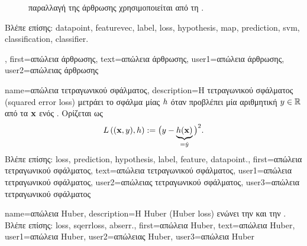 {{\begin{figure}[H]
\begin{center}
{{{			παραλλαγή της}  \foreignlanguage{greek}{άρθρωσης χρησιμοποιείται από τη}  
			\cite{LampertNowKernel}.}\label{fig_hingeloss_dict}}
		\end{center}
		\end{figure} 
	    	\foreignlanguage{greek}{Βλέπε επίσης:} \gls{datapoint}, \gls{featurevec}, \gls{label}, \gls{loss}, \gls{hypothesis}, \gls{map}, 
		\gls{prediction}, \gls{svm}, \gls{classification}, \gls{classifier}.},
	first={\foreignlanguage{greek}{απώλεια άρθρωσης}},
	text={\foreignlanguage{greek}{απώλεια άρθρωσης}},
	user1={\foreignlanguage{greek}{απώλεια άρθρωσης}}, %
	user2={\foreignlanguage{greek}{απώλειας άρθρωσης}} %
}

{name={\foreignlanguage{greek}{απώλεια τετραγωνικού σφάλματος}},
	description={\foreignlanguage{greek}{Η} 
		 \foreignlanguage{greek}{τετραγωνικού σφάλματος} (squared error loss) \foreignlanguage{greek}{μετράει το 
		σφάλμα}  \foreignlanguage{greek}{μίας}  $h$ \foreignlanguage{greek}{όταν 
		προβλέπει μία αριθμητική}  $y \in \mathbb{R}$ \foreignlanguage{greek}{από τα}  
		${\bf x}$ \foreignlanguage{greek}{ενός} . \foreignlanguage{greek}{Ορίζεται ως}  
		\begin{equation} 
			\nonumber
			L\left(({\bf x},y),h \right) := \big(y - \underbrace{h({\bf x})}_{=\hat{y}} \big)^{2}. 
		\end{equation} 
		\foreignlanguage{greek}{Βλέπε επίσης:} \gls{loss}, \gls{prediction}, \gls{hypothesis}, \gls{label}, \gls{feature}, \gls{datapoint}.},
	first={\foreignlanguage{greek}{απώλεια τετραγωνικού σφάλματος}},
	text={\foreignlanguage{greek}{απώλεια τετραγωνικού σφάλματος}},
	user1={\foreignlanguage{greek}{απώλεια τετραγωνικού σφάλματος}}, %
	user2={\foreignlanguage{greek}{απώλειας τετραγωνικού σφάλματος}}, %
	user3={\foreignlanguage{greek}{απώλεια τετραγωνικού σφάλματος}} %
}

{name={\foreignlanguage{greek}{απώλεια} Huber}, 
	description={\foreignlanguage{greek}{Η} 
		 Huber (Huber loss) \foreignlanguage{greek}{ενώνει την}  
		\foreignlanguage{greek}{και την} .
		\\
		\foreignlanguage{greek}{Βλέπε επίσης:} \gls{loss}, \gls{sqerrloss}, \gls{abserr}.},
	first={\foreignlanguage{greek}{απώλεια} Huber},
	text={\foreignlanguage{greek}{απώλεια} Huber},
	user1={\foreignlanguage{greek}{απώλεια} Huber}, %
	user2={\foreignlanguage{greek}{απώλειας} Huber}, %
	user3={\foreignlanguage{greek}{απώλεια} Huber} %
}

